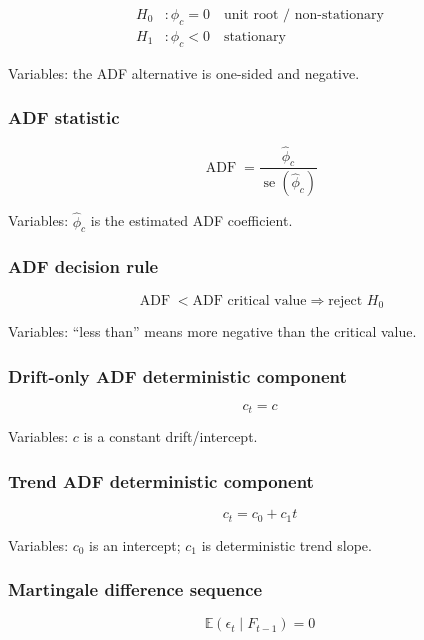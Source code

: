 \documentclass[
  8pt,
  twocolumn]{extarticle}
\begin{document}
\[
\begin{aligned}
H_0&:\phi_c=0\quad \text{unit root / non-stationary}\\
H_1&:\phi_c<0\quad \text{stationary}
\end{aligned}
\]

Variables: the ADF alternative is one-sided and negative.

\subsubsection{ADF statistic}\label{adf-statistic}

\[
\operatorname{ADF}=\frac{\hat\phi_c}{\operatorname{se}(\hat\phi_c)}
\]

Variables: \(\hat\phi_c\) is the estimated ADF coefficient.

\subsubsection{ADF decision rule}\label{adf-decision-rule}

\[
\operatorname{ADF}<\text{ADF critical value}\Rightarrow \text{reject }H_0
\]

Variables: ``less than'' means more negative than the critical value.

\subsubsection{Drift-only ADF deterministic
component}\label{drift-only-adf-deterministic-component}

\[
c_t=c
\]

Variables: \(c\) is a constant drift/intercept.

\subsubsection{Trend ADF deterministic
component}\label{trend-adf-deterministic-component}

\[
c_t=c_0+c_1t
\]

Variables: \(c_0\) is an intercept; \(c_1\) is deterministic trend
slope.

\subsubsection{Martingale difference
sequence}\label{martingale-difference-sequence}

\[
\mathbb E(\epsilon_t\mid F_{t-1})=0
\]
\end{document}
